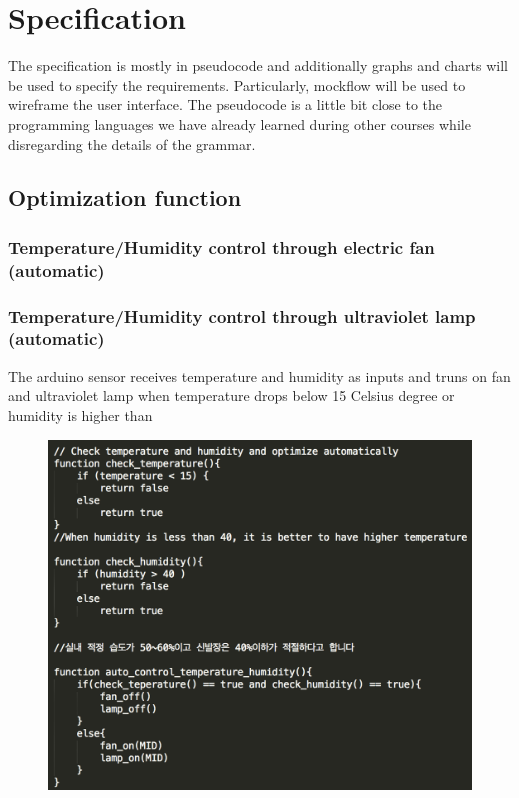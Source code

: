 \documentclass[conference]{IEEEtran}
\begin{document}
\section{Specification}
The specification is mostly in pseudocode and additionally graphs and charts will be used to specify the requirements. Particularly, mockflow will be used to wireframe the user interface. The pseudocode is a little bit close to the programming languages we have already learned during other courses while disregarding the details of the grammar.
\subsection{Optimization function}
\subsubsection{Temperature/Humidity control through electric fan (automatic)}
\subsubsection{Temperature/Humidity control through ultraviolet lamp (automatic)}
The arduino sensor receives temperature and humidity as inputs and truns on fan and ultraviolet lamp when temperature drops below 15 Celsius degree or humidity is higher than 
\begin{figure}[h]
\begin{center}
    \includegraphics[scale=0.48]{optimization1}
    \label{fig:label}
\end{center}
\end{figure}
\end{document}
